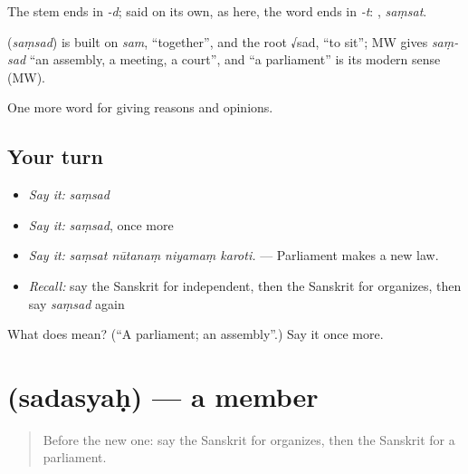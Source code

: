 The stem ends in \emph{-d}; said on its own, as here, the word ends in \emph{-t}: , \emph{saṃsat}.

\begin{cousinweb}
\textbf{} (\emph{saṃsad}) is built on \emph{sam}, \textquotedblleft{}together\textquotedblright{}, and the root √sad, \textquotedblleft{}to sit\textquotedblright{}; MW gives \emph{saṃ-sad} \textquotedblleft{}an assembly, a meeting, a court\textquotedblright{}, and \textquotedblleft{}a parliament\textquotedblright{} is its modern sense (MW).
\end{cousinweb}

\begin{grammarlens}[title={What you've built}]
One more word for giving reasons and opinions.
\end{grammarlens}

\subsection*{Your turn}
\begin{itemize}
\raggedright
  \item \emph{Say it:} \emph{saṃsad}
  \item \emph{Say it:} \emph{saṃsad}, once more
  \item \emph{Say it:} \emph{saṃsat nūtanaṃ niyamaṃ karoti.} — Parliament makes a new law.
  \item \emph{Recall:} say the Sanskrit for independent, then the Sanskrit for organizes, then say \emph{saṃsad} again
\end{itemize}

\begin{tcolorbox}[breakable,colback=teal!4,colframe=teal!35!black,title={Before you move on}]
What does  mean? (\textquotedblleft{}A parliament; an assembly\textquotedblright{}.) Say it once more.
\end{tcolorbox}
\section[\texorpdfstring{\sk{सदस्यः} (sadasyaḥ)}{सदस्यः (sadasyaḥ)}]{ (sadasyaḥ) — a member}

\label{lesson:SA-C355-sadasyah}



\begin{quote}
Before the new one: say the Sanskrit for organizes, then the Sanskrit for a parliament.
\end{quote}

